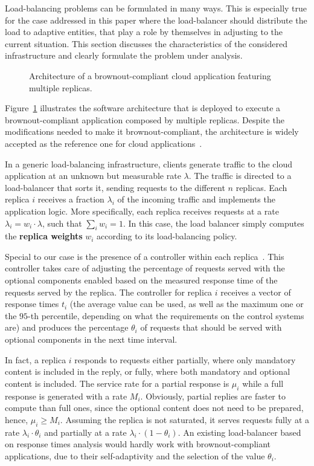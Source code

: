 Load-balancing problems can be formulated in many ways. This is
especially true for the case addressed in this paper where the
load-balancer should distribute the load to adaptive entities, that
play a role by themselves in adjusting to the current situation. This
section discusses the characteristics of the considered infrastructure
and clearly formulate the problem under analysis.

\begin{figure}[t]
  \centering 
   
  \caption{Architecture of a brownout-compliant cloud application
    featuring multiple replicas.}
  \label{fig:architecture}
\end{figure}

Figure~\ref{fig:architecture} illustrates the software architecture
that is deployed to execute a brownout-compliant application composed
by multiple replicas. Despite the modifications needed to make it
brownout-compliant, the architecture is widely accepted as the
reference one for cloud applications~\citep{Barroso09}.

In a generic load-balancing infrastructure, clients generate traffic
to the cloud application at an unknown but measurable rate
$\lambda$. The traffic is directed to a load-balancer that sorts it,
sending requests to the different $n$ replicas. Each replica $i$
receives a fraction $\lambda_i$ of the incoming traffic and implements
the application logic. More specifically, each replica receives
requests at a rate $\lambda_i = w_i \cdot \lambda$, such that
$\sum_{i} w_i = 1$. In this case, the load balancer simply computes
the \textbf{replica weights} $w_i$ according to its load-balancing
policy.

Special to our case is the presence of a controller within each
replica~\cite{cloudish-tr}. This controller takes care of adjusting
the percentage of requests served with the optional components enabled
based on the measured response time of the requests served by the
replica. The controller for replica $i$ receives a vector of response
times $t_i$ (the average value can be used, as well as the maximum one
or the $95$-th percentile, depending on what the requirements on the
control systems are) and produces the percentage $\theta_i$ of
requests that should be served with optional components in the next
time interval.

In fact, a replica $i$ responds to requests either partially, where
only mandatory content is included in the reply, or fully, where both
mandatory and optional content is included. The service rate for a
partial response is $\mu_i$ while a full response is generated with a
rate $M_i$. Obviously, partial replies are faster to compute than full
ones, since the optional content does not need to be prepared, hence,
$\mu_i \geq M_i$. Assuming the replica is not saturated, it serves
requests fully at a rate $\lambda_i \cdot \theta_i$ and partially at a
rate $\lambda_i \cdot (1-\theta_i)$. An existing load-balancer based
on response times analysis would hardly work with brownout-compliant
applications, due to their self-adaptivity and the selection of the
value $\theta_i$.

